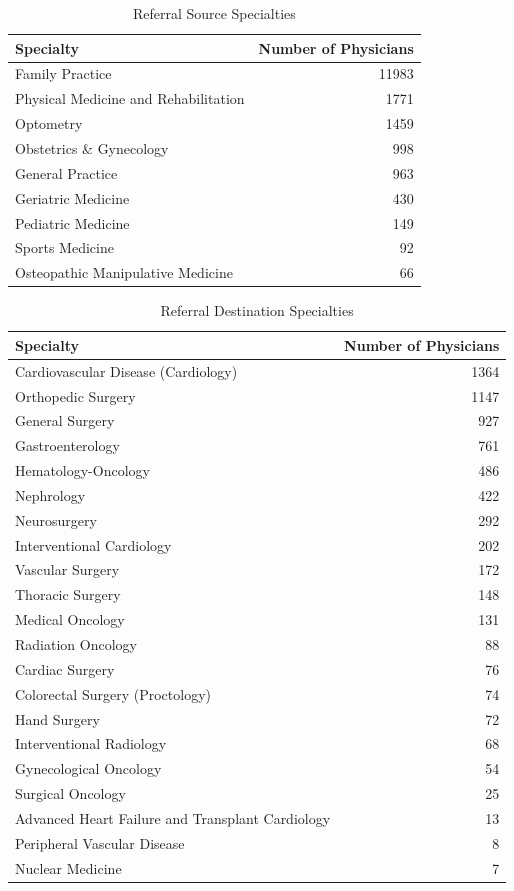 \documentclass[
  12pt,
]{article}
\begin{document}
\FloatBarrier

\begin{table}

\caption{\label{tab:src}Referral Source Specialties}
\centering
\begin{tabular}[t]{lr}
\toprule
Specialty & Number of Physicians\\
\midrule
Family Practice & 11983\\
Physical Medicine and Rehabilitation & 1771\\
Optometry & 1459\\
Obstetrics \& Gynecology & 998\\
General Practice & 963\\
\addlinespace
Geriatric Medicine & 430\\
Pediatric Medicine & 149\\
Sports Medicine & 92\\
Osteopathic Manipulative Medicine & 66\\
\bottomrule
\end{tabular}
\end{table}

\FloatBarrier

\begin{table}

\caption{\label{tab:dest}Referral Destination Specialties}
\centering
\begin{tabular}[t]{lr}
\toprule
Specialty & Number of Physicians\\
\midrule
Cardiovascular Disease (Cardiology) & 1364\\
Orthopedic Surgery & 1147\\
General Surgery & 927\\
Gastroenterology & 761\\
Hematology-Oncology & 486\\
\addlinespace
Nephrology & 422\\
Neurosurgery & 292\\
Interventional Cardiology & 202\\
Vascular Surgery & 172\\
Thoracic Surgery & 148\\
\addlinespace
Medical Oncology & 131\\
Radiation Oncology & 88\\
Cardiac Surgery & 76\\
Colorectal Surgery (Proctology) & 74\\
Hand Surgery & 72\\
\addlinespace
Interventional Radiology & 68\\
Gynecological Oncology & 54\\
Surgical Oncology & 25\\
Advanced Heart Failure and Transplant Cardiology & 13\\
Peripheral Vascular Disease & 8\\
\addlinespace
Nuclear Medicine & 7\\
\bottomrule
\end{tabular}
\end{table}
\end{document}
